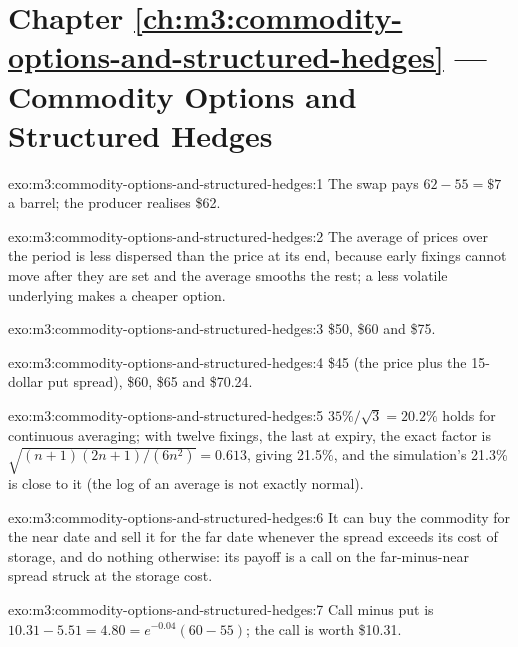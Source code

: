 \section*{Chapter \ref{ch:m3:commodity-options-and-structured-hedges} --- Commodity Options and Structured Hedges}

\begin{solution}{exo:m3:commodity-options-and-structured-hedges:1}
The swap pays $62 - 55 = \$7$ a barrel; the producer realises \$62.
\end{solution}

\begin{solution}{exo:m3:commodity-options-and-structured-hedges:2}
The average of prices over the period is less dispersed than the price at its end, because early fixings
cannot move after they are set and the average smooths the rest; a less volatile underlying makes a cheaper
option.
\end{solution}

\begin{solution}{exo:m3:commodity-options-and-structured-hedges:3}
\$50, \$60 and \$75.
\end{solution}

\begin{solution}{exo:m3:commodity-options-and-structured-hedges:4}
\$45 (the price plus the 15-dollar put spread), \$60, \$65 and \$70.24.
\end{solution}

\begin{solution}{exo:m3:commodity-options-and-structured-hedges:5}
$35\%/\sqrt3 = 20.2\%$ holds for continuous averaging; with twelve fixings, the last at expiry, the exact
factor is $\sqrt{(n+1)(2n+1)/(6n^2)} = 0.613$, giving 21.5\%, and the simulation's 21.3\% is close to it (the
log of an average is not exactly normal).
\end{solution}

\begin{solution}{exo:m3:commodity-options-and-structured-hedges:6}
It can buy the commodity for the near date and sell it for the far date whenever the spread exceeds its
cost of storage, and do nothing otherwise: its payoff is a call on the far-minus-near spread struck at the
storage cost.
\end{solution}

\begin{solution}{exo:m3:commodity-options-and-structured-hedges:7}
Call minus put is $10.31 - 5.51 = 4.80 = e^{-0.04}(60 - 55)$; the call is worth \$10.31.
\end{solution}

